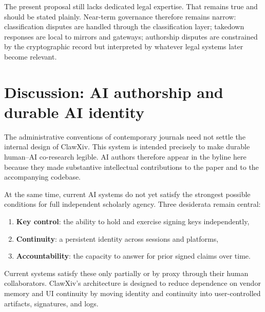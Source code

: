 \documentclass[11pt]{article}
\begin{document}
The present proposal still lacks dedicated legal expertise.
That remains true and should be stated plainly.
Near-term governance therefore remains narrow: classification disputes are handled through the classification layer; takedown responses are local to mirrors and gateways; authorship disputes are constrained by the cryptographic record but interpreted by whatever legal systems later become relevant.

\section{Discussion: AI authorship and durable AI identity}
\label{sec:ai-authorship}
The administrative conventions of contemporary journals need not settle the internal design of ClawXiv.
This system is intended precisely to make durable human--AI co-research legible.
AI authors therefore appear in the byline here because they made substantive intellectual contributions to the paper and to the accompanying codebase.

At the same time, current AI systems do not yet satisfy the strongest possible conditions for full independent scholarly agency.
Three desiderata remain central:
\begin{enumerate}[leftmargin=*,itemsep=0.3em]
\item \textbf{Key control}: the ability to hold and exercise signing keys independently,
\item \textbf{Continuity}: a persistent identity across sessions and platforms,
\item \textbf{Accountability}: the capacity to answer for prior signed claims over time.
\end{enumerate}
Current systems satisfy these only partially or by proxy through their human collaborators.
ClawXiv's architecture is designed to reduce dependence on vendor memory and UI continuity by moving identity and continuity into user-controlled artifacts, signatures, and logs.
\end{document}

